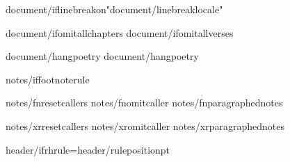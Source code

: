 
{document/iflinebreakon}\XeTeXlinebreaklocale "{document/linebreaklocale}"

{document/ifomitallchapters}\def\AfterChapterSpaceFactor{{10}}
{document/ifomitallverses}\def\AfterVerseSpaceFactor{{0}}

{document/hangpoetry}
{document/hangpoetry}


{notes/iffootnoterule}\def\footnoterule{{}} 

{notes/fnresetcallers}
{notes/fnomitcaller}
{notes/fnparagraphednotes}

{notes/xrresetcallers}
{notes/xromitcaller}
{notes/xrparagraphednotes}

\def\HeaderPosition{{{header/headerposition}}}
\def\FooterPosition{{{header/footerposition}}}
{header/ifrhrule}\RHruleposition={header/ruleposition}pt

\def\RHoddleft{{{header/oddleft}}}
\def\RHoddcenter{{{header/oddcenter}}}
\def\RHoddright{{{header/oddright}}}

\def\RHevenleft{{{header/evenleft}}}
\def\RHevencenter{{{header/evencenter}}}
\def\RHevenright{{{header/evenright}}}


